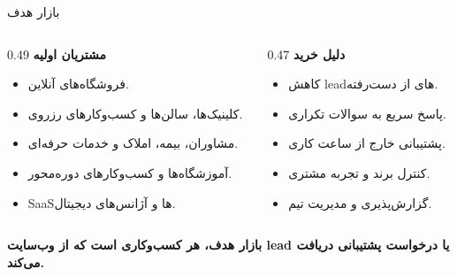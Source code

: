 \documentclass[aspectratio=169,12pt]{beamer}
\begin{document}
\begin{frame}{بازار هدف}
  \begin{columns}[T,totalwidth=\textwidth]
    \begin{column}{0.49\textwidth}
      \textbf{مشتریان اولیه}
      \begin{itemize}
        \item فروشگاه‌های آنلاین.
        \item کلینیک‌ها، سالن‌ها و کسب‌وکارهای رزروی.
        \item مشاوران، بیمه، املاک و خدمات حرفه‌ای.
        \item آموزشگاه‌ها و کسب‌وکارهای دوره‌محور.
        \item SaaSها و آژانس‌های دیجیتال.
      \end{itemize}
    \end{column}
    \begin{column}{0.47\textwidth}
      \textbf{دلیل خرید}
      \begin{itemize}
        \item کاهش leadهای از دست‌رفته.
        \item پاسخ سریع به سوالات تکراری.
        \item پشتیبانی خارج از ساعت کاری.
        \item کنترل برند و تجربه مشتری.
        \item گزارش‌پذیری و مدیریت تیم.
      \end{itemize}
    \end{column}
  \end{columns}

  \vspace{5mm}
  \begin{center}
    \Large\bfseries\color{primary}
    بازار هدف، هر کسب‌وکاری است که از وب‌سایت lead یا درخواست پشتیبانی دریافت می‌کند.
  \end{center}
\end{frame}
\end{document}
